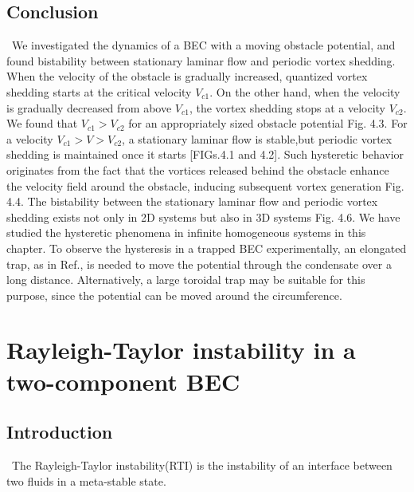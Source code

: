 \documentclass[12pt,a4paper]{report}
\begin{document}
\section{Conclusion}
\ We investigated the dynamics of a BEC with a moving
obstacle potential, and found bistability between stationary
laminar flow and periodic vortex shedding. When the velocity
of the obstacle is gradually increased, quantized vortex
shedding starts at the critical velocity $V_{c1}$. On the other hand,
when the velocity is gradually decreased from above $V_{c1}$,
the vortex shedding stops at a velocity $V_{c2}$. We found that
$V_{c1} > V_{c2}$ for an appropriately sized obstacle potential Fig. 4.3.
For a velocity $V_{c1} > V > V_{c2}$, a stationary laminar flow is
stable,but periodic vortex shedding is maintained once it starts
[FIGs.4.1 and 4.2]. Such hysteretic behavior originates from the
fact that the vortices released behind the obstacle enhance the
velocity field around the obstacle, inducing subsequent vortex
generation Fig. 4.4. The bistability between the stationary
laminar flow and periodic vortex shedding exists not only in
2D systems but also in 3D systems Fig. 4.6.
We have studied the hysteretic phenomena in infinite
homogeneous systems in this chapter. To observe the hysteresis
in a trapped BEC experimentally, an elongated trap, as
in Ref.\cite{57}, is needed to move the potential through the
condensate over a long distance.
Alternatively, a large toroidal trap may be suitable for
this purpose, since the potential can be moved around the 
circumference.

\chapter{Rayleigh-Taylor instability in a two-component BEC}
\section{Introduction}
\ The Rayleigh-Taylor instability(RTI) \cite{58}\cite{59}\cite{60}\cite{61} is the instability of an interface between
two fluids in a meta-stable state.
\end{document}
